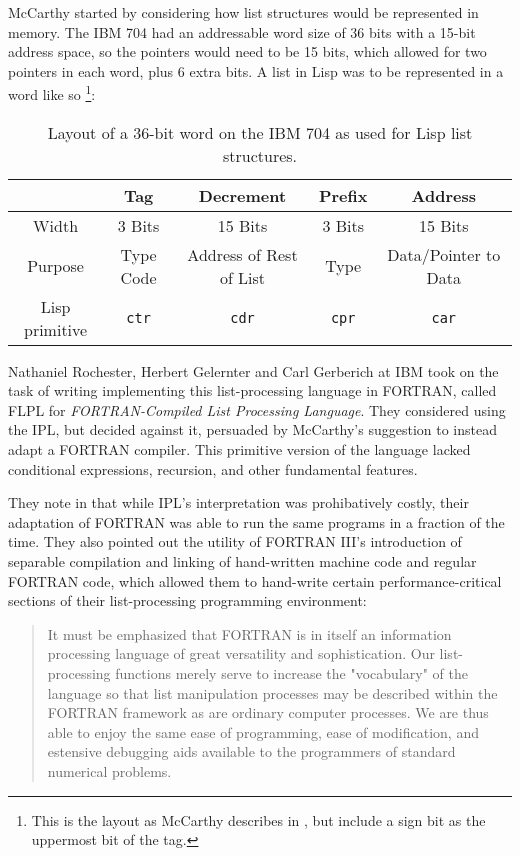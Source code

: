 McCarthy started by considering how list structures would be represented in
memory. The IBM 704 had an addressable word size of 36 bits with
a 15-bit address space, so the pointers would need to be 15 bits,
which allowed for two pointers in each word, plus 6 extra bits.
A list in Lisp was to be represented in a word like so
\footnote{This is the layout as McCarthy describes in ,
	but \citeauthor{gelernter_flpl_1960} include a sign bit as the uppermost bit of the tag.}:

\begin{table}[h]
	\centering
	\begin{tabular}{|c|c|c|c|c|}
		\hline
		               & \textbf{Tag} & \textbf{Decrement}      & \textbf{Prefix} & \textbf{Address}     \\
		\hline
		Width          & 3 Bits       & 15 Bits                 & 3 Bits          & 15 Bits              \\
		\hline
		Purpose        & Type Code    & Address of Rest of List & Type            & Data/Pointer to Data \\
		\hline
		Lisp primitive & \texttt{ctr} & \texttt{cdr}            & \texttt{cpr}    & \texttt{car}         \\
		\hline
	\end{tabular}
	\caption{Layout of a 36-bit word on the IBM 704 as used for Lisp list structures.}
\end{table}

Nathaniel Rochester, Herbert Gelernter and Carl Gerberich at IBM
took on the task of writing implementing this list-processing language
in FORTRAN, called FLPL for \textit{FORTRAN-Compiled List Processing Language}.
They considered using the IPL, but decided against it, persuaded by McCarthy's suggestion
to instead adapt a FORTRAN compiler.
This primitive version of the language lacked conditional expressions, recursion, and other
fundamental features.

They note in  that while IPL's interpretation was prohibatively
costly, their adaptation of FORTRAN was able to run the same programs in a fraction of the time.
They also pointed out the utility of FORTRAN III's introduction of separable compilation and linking of
hand-written machine code and regular FORTRAN code, which allowed them to hand-write certain
performance-critical sections of their list-processing programming environment\cite{gelernter_flpl_1960}:

\begin{quotation}
	It must be emphasized that
	FORTRAN is in itself an information processing language of great versatility and
	sophistication. Our list-processing functions merely serve to increase the "vocabulary"
	of the language so that list manipulation processes may be described within
	the FORTRAN framework as are ordinary computer processes. We are thus able
	to enjoy the same ease of programming, ease of modification, and estensive debugging
	aids available to the programmers of standard numerical problems.
\end{quotation}

